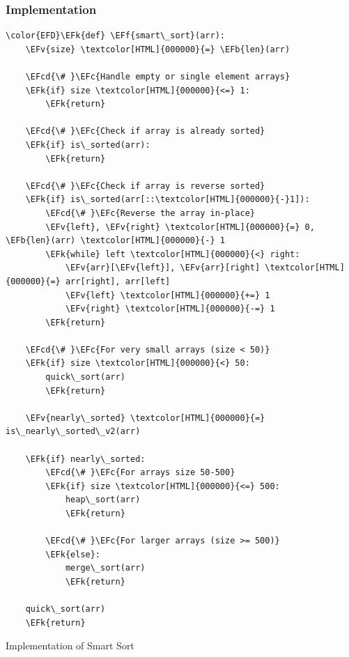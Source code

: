 \documentclass[a4paper,12pt]{article}
\newcommand{\EFc}[1]{\textcolor{EFc}{#1}} %
\newcommand{\EFcd}[1]{\textcolor{EFcd}{#1}} %
\newcommand{\EFk}[1]{\textcolor{EFk}{#1}} %
\newcommand{\EFb}[1]{\textcolor{EFb}{#1}} %
\newcommand{\EFf}[1]{\textcolor{EFf}{#1}} %
\newcommand{\EFv}[1]{\textcolor{EFv}{#1}} %
\begin{document}
\subsubsection{Implementation}
\label{sec:org1e786df}
\begin{listing}[htbp]
\begin{Code}
\begin{Verbatim}
\color{EFD}\EFk{def} \EFf{smart\_sort}(arr):
    \EFv{size} \textcolor[HTML]{000000}{=} \EFb{len}(arr)

    \EFcd{\# }\EFc{Handle empty or single element arrays}
    \EFk{if} size \textcolor[HTML]{000000}{<=} 1:
        \EFk{return}

    \EFcd{\# }\EFc{Check if array is already sorted}
    \EFk{if} is\_sorted(arr):
        \EFk{return}

    \EFcd{\# }\EFc{Check if array is reverse sorted}
    \EFk{if} is\_sorted(arr[::\textcolor[HTML]{000000}{-}1]):
        \EFcd{\# }\EFc{Reverse the array in-place}
        \EFv{left}, \EFv{right} \textcolor[HTML]{000000}{=} 0, \EFb{len}(arr) \textcolor[HTML]{000000}{-} 1
        \EFk{while} left \textcolor[HTML]{000000}{<} right:
            \EFv{arr}[\EFv{left}], \EFv{arr}[right] \textcolor[HTML]{000000}{=} arr[right], arr[left]
            \EFv{left} \textcolor[HTML]{000000}{+=} 1
            \EFv{right} \textcolor[HTML]{000000}{-=} 1
        \EFk{return}

    \EFcd{\# }\EFc{For very small arrays (size < 50)}
    \EFk{if} size \textcolor[HTML]{000000}{<} 50:
        quick\_sort(arr)
        \EFk{return}

    \EFv{nearly\_sorted} \textcolor[HTML]{000000}{=} is\_nearly\_sorted\_v2(arr)

    \EFk{if} nearly\_sorted:
        \EFcd{\# }\EFc{For arrays size 50-500}
        \EFk{if} size \textcolor[HTML]{000000}{<=} 500:
            heap\_sort(arr)
            \EFk{return}

        \EFcd{\# }\EFc{For larger arrays (size >= 500)}
        \EFk{else}:
            merge\_sort(arr)
            \EFk{return}

    quick\_sort(arr)
    \EFk{return}
\end{Verbatim}
\end{Code}
\caption{Implementation of Smart Sort}
\end{listing}
\end{document}
